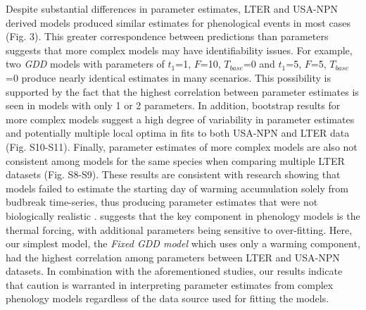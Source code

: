 \documentclass[fleqn,12pt,lineno]{article}
\begin{document}
Despite substantial differences in parameter estimates, LTER and USA-NPN derived models produced similar estimates for phenological events in most cases (Fig. 3). This greater correspondence between predictions than parameters suggests that more complex models may have identifiability issues. For example, two \textit{GDD} models with parameters of $t_{1}$=1, $F$=10, $T_{base}$=0 and $t_{1}$=5, $F$=5, $T_{base}$=0 produce nearly identical estimates in many scenarios. This possibility is supported by the fact that the highest correlation between parameter estimates is seen in models with only 1 or 2 parameters. In addition, bootstrap results for more complex models suggest a high degree of variability in parameter estimates and potentially multiple local optima in fits to both USA-NPN and LTER data (Fig. S10-S11). Finally, parameter estimates of more complex models are also not consistent among models for the same species when comparing multiple LTER datasets (Fig. S8-S9). These results are consistent with research showing that models failed to estimate the starting day of warming accumulation solely from budbreak time-series, thus producing parameter estimates that were not biologically realistic \citep{chuine2016}. \cite{basler2016} suggests that the key component in phenology models is the thermal forcing, with additional parameters being sensitive to over-fitting. Here, our simplest model, the \textit{Fixed GDD model} which uses only a warming component, had the highest correlation among parameters between LTER and USA-NPN datasets. In combination with the aforementioned studies, our results indicate that caution is warranted in interpreting parameter estimates from complex phenology models regardless of the data source used for fitting the models.
\end{document}
